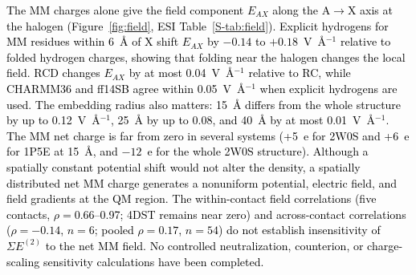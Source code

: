 \documentclass[journal=jcisd8,manuscript=article,layout=two-column]{achemso}
\newcommand{\tcb}[1]{{\textcolor{black}{#1}}}
\begin{document}
\tcb{The MM charges alone give the field component $E_{AX}$ along the A$\to$X axis at the halogen (Figure~\ref{fig:field}, ESI Table~\ref{S-tab:field}). Explicit hydrogens for MM residues within 6~\AA{} of X shift $E_{AX}$ by $-0.14$ to $+0.18$~V~\AA$^{-1}$ relative to folded hydrogen charges, showing that folding near the halogen changes the local field. RCD changes $E_{AX}$ by at most 0.04~V~\AA$^{-1}$ relative to RC, while CHARMM36 and ff14SB agree within 0.05~V~\AA$^{-1}$ when explicit hydrogens are used. The embedding radius also matters: 15~\AA{} differs from the whole structure by up to 0.12~V~\AA$^{-1}$, 25~\AA{} by up to 0.08, and 40~\AA{} by at most 0.01~V~\AA$^{-1}$. The MM net charge is far from zero in several systems (+5~e for 2W0S and +6~e for 1P5E at 15~\AA{}, and $-12$~e for the whole 2W0S structure). Although a spatially constant potential shift would not alter the density, a spatially distributed net MM charge generates a nonuniform potential, electric field, and field gradients at the QM region. The within-contact field correlations (five contacts, $\rho=0.66$--0.97; 4DST remains near zero) and across-contact correlations ($\rho=-0.14$, $n=6$; pooled $\rho=0.17$, $n=54$) do not establish insensitivity of $\Sigma E^{(2)}$ to the net MM field. No controlled neutralization, counterion, or charge-scaling sensitivity calculations have been completed.}
\end{document}
